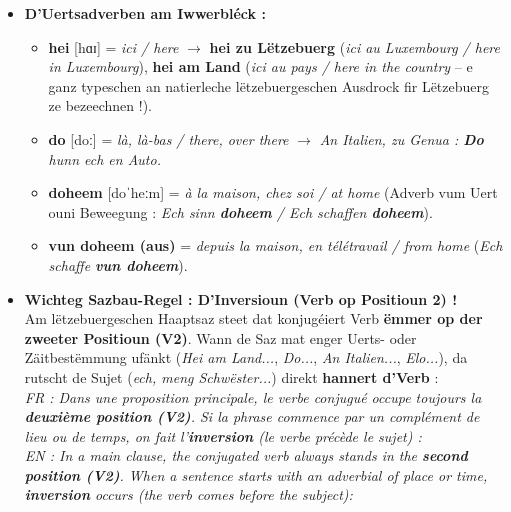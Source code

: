 \begin{itemize}
    \item \textbf{D'Uertsadverben am Iwwerbléck :}
    \begin{itemize}
        \item \textbf{hei} {[hɑɪ]} = \textit{ici / here} $\rightarrow$ \textbf{hei zu Lëtzebuerg} (\textit{ici au Luxembourg / here in Luxembourg}), \textbf{hei am Land} (\textit{ici au pays / here in the country} -- e ganz typeschen an natierleche lëtzebuergeschen Ausdrock fir Lëtzebuerg ze bezeechnen !).
        \item \textbf{do} {[doː]} = \textit{là, là-bas / there, over there} $\rightarrow$ \textit{An Italien, zu Genua : \textbf{Do} hunn ech en Auto.}
        \item \textbf{doheem} {[doˈheːm]} = \textit{à la maison, chez soi / at home} (Adverb vum Uert ouni Beweegung : \textit{Ech sinn \textbf{doheem} / Ech schaffen \textbf{doheem}}).
        \item \textbf{vun doheem (aus)} = \textit{depuis la maison, en télétravail / from home} (\textit{Ech schaffe \textbf{vun doheem}}).
    \end{itemize}

    \vspace{0.4em}

    \item \textbf{Wichteg Sazbau-Regel : D'Inversioun (Verb op Positioun 2) !} \\
    Am lëtzebuergeschen Haaptsaz steet dat konjugéiert Verb \textbf{ëmmer op der zweeter Positioun (V2)}. Wann de Saz mat enger Uerts- oder Zäitbestëmmung ufänkt (\textit{Hei am Land...}, \textit{Do...}, \textit{An Italien...}, \textit{Elo...}), da rutscht de Sujet (\textit{ech, meng Schwëster...}) direkt \textbf{hannert d'Verb} : \\
    \textit{FR : Dans une proposition principale, le verbe conjugué occupe toujours la \textbf{deuxième position (V2)}. Si la phrase commence par un complément de lieu ou de temps, on fait l'\textbf{inversion} (le verbe précède le sujet) :} \\
    \textit{EN : In a main clause, the conjugated verb always stands in the \textbf{second position (V2)}. When a sentence starts with an adverbial of place or time, \textbf{inversion} occurs (the verb comes before the subject):}


\end{itemize}

